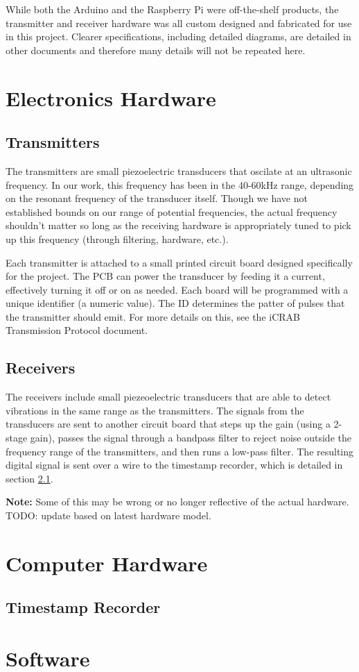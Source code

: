 \documentclass[12pt]{article}
\begin{document}
While both the Arduino and the Raspberry Pi were off-the-shelf products,
the transmitter and receiver hardware was all custom designed and fabricated
for use in this project.
Clearer specifications, including detailed diagrams, are detailed in other
documents and therefore many details will not be repeated here.

\section{Electronics Hardware}\label{sec:ee-hardware}

\subsection{Transmitters}

The transmitters are small piezoelectric transducers that oscilate at an
ultrasonic frequency.
In our work, this frequency has been in the 40-60kHz range, depending on the
resonant frequency of the transducer itself.
Though we have not established bounds on our range of potential frequencies,
the actual frequency shouldn't matter so long as the receiving hardware is
appropriately tuned to pick up this frequency (through filtering, hardware,
etc.).

Each transmitter is attached to a small printed circuit board designed
specifically for the project.
The PCB can power the transducer by feeding it a current, effectively turning
it off or on as needed.
Each board will be programmed with a unique identifier (a numeric value).
The ID determines the patter of pulses that the transmitter should emit.
For more details on this, see the iCRAB Transmission Protocol document.

\subsection{Receivers}

The receivers include small piezeoelectric transducers that are able to detect
vibrations in the same range as the transmitters.
The signals from the transducers are sent to another circuit board that
steps up the gain (using a 2-stage gain), passes the signal through a bandpass
filter to reject noise outside the frequency range of the transmitters,
and then runs a low-pass filter.
The resulting digital signal is sent over a wire to the timestamp recorder,
which is detailed in section \ref{sec:ts-rec}.

{\bf Note:} Some of this may be wrong or no longer reflective of the actual
hardware. TODO: update based on latest hardware model.

\section{Computer Hardware}\label{sec:cs-hardware}

\subsection{Timestamp Recorder}\label{sec:ts-rec}

\section{Software}\label{sec:software}
\end{document}
